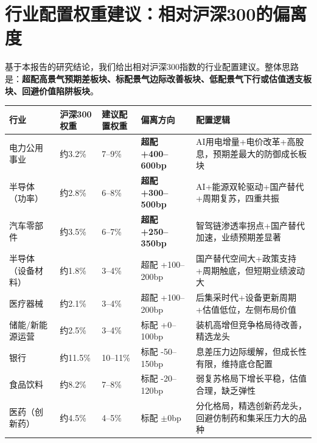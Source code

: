 \section{行业配置权重建议：相对沪深300的偏离度}

基于本报告的研究结论，我们给出相对沪深300指数的行业配置建议。整体思路是：\textbf{超配高景气预期差板块、标配景气边际改善板块、低配景气下行或估值透支板块、回避价值陷阱板块}。

\begin{exhibitbox}
\centering
\small
\setlength{\tabcolsep}{3pt}
\setlength{\aboverulesep}{0pt}
\setlength{\belowrulesep}{0pt}
\begin{tabularx}{\linewidth}{L{3.2cm} R{1.5cm} R{1.7cm} C{3.0cm} X}
\toprule
\textbf{行业} & \textbf{沪深300权重} & \textbf{建议配置权重} & \textbf{偏离方向} & \textbf{配置逻辑} \\
\midrule
{}
电力公用事业 & 约3.2\% & 7--9\% & \textcolor{riskgreen}{\textbf{超配 +400--600bp}} & AI用电增量+电价改革+高股息，预期差最大的防御成长板块 \\
半导体（功率） & 约2.8\% & 6--8\% & \textcolor{riskgreen}{\textbf{超配 +300--500bp}} & AI+能源双轮驱动+国产替代+周期复苏，四重共振 \\
汽车零部件 & 约3.5\% & 6--7\% & \textcolor{riskgreen}{\textbf{超配 +250--350bp}} & 智驾链渗透率拐点+国产替代加速，业绩预期差显著 \\
\midrule
{}
半导体（设备材料） & 约1.8\% & 3--4\% & \textcolor{accentblue}{超配 +100--200bp} & 国产替代空间大+政策支持+周期触底，但短期业绩波动大 \\
医疗器械 & 约2.1\% & 3--4\% & \textcolor{accentblue}{超配 +100--200bp} & 后集采时代+设备更新周期+估值低位，左侧布局价值 \\
储能/新能源运营 & 约2.5\% & 3--4\% & \textcolor{accentblue}{标配 +0--100bp} & 装机高增但竞争格局待改善，精选龙头 \\
\midrule
{}
银行 & 约11.5\% & 10--11\% & \textcolor{steelgrey}{标配 -50--150bp} & 息差压力边际缓解，但成长性有限，维持底仓配置 \\
食品饮料 & 约8.2\% & 7--8\% & \textcolor{steelgrey}{标配 -20--120bp} & 弱复苏格局下增长平稳，估值合理，缺乏弹性 \\
医药（创新药） & 约4.5\% & 4--5\% & \textcolor{steelgrey}{标配 $\pm{}0$bp} & 分化格局，精选创新药龙头，回避仿制药和集采压力大的品种 \\

\end{tabularx}
\end{exhibitbox}

